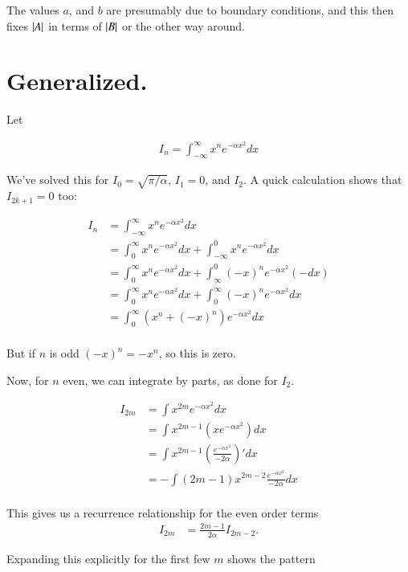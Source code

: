 The values $a$, and $b$ are presumably due to boundary conditions, and this then fixes $\left\lvert{A}\right\rvert$ in terms of $\left\lvert{B}\right\rvert$ or the other way around.

\section{Generalized. }

Let 

\begin{align}
I_n = \int_{-\infty}^\infty x^n e^{-\alpha x^2} dx
\end{align}

We've solved this for $I_0 = \sqrt{\pi/\alpha}$, $I_1 = 0$, and $I_2$.  A quick calculation shows that $I_{2k+1} = 0$ too:

\begin{align*}
I_n 
&= \int_{-\infty}^\infty x^n e^{-\alpha x^2} dx \\
&= \int_{0}^\infty x^n e^{-\alpha x^2} dx +\int_{-\infty}^0 x^n e^{-\alpha x^2} dx \\
&= \int_{0}^\infty x^n e^{-\alpha x^2} dx +\int_{\infty}^0 (-x)^n e^{-\alpha x^2} (-dx) \\
&= \int_{0}^\infty x^n e^{-\alpha x^2} dx +\int_0^{\infty} (-x)^n e^{-\alpha x^2} dx \\
&= \int_{0}^\infty (x^n + (-x)^n)e^{-\alpha x^2} dx \\
\end{align*}

But if $n$ is odd $(-x)^n = -x^n$, so this is zero.

Now, for $n$ even, we can integrate by parts, as done for $I_2$.

\begin{align*}
I_{2m}
&= \int x^{2m} e^{-\alpha x^2} dx \\
&= \int x^{2m-1} \left(x e^{-\alpha x^2}\right) dx \\
&= \int x^{2m-1} \left(\frac{e^{-\alpha x^2}}{-2\alpha}\right)' dx \\
&= -\int (2m-1) x^{2m-2} \frac{e^{-\alpha x^2}}{-2\alpha} dx \\
\end{align*}

This gives us a recurrence relationship for the even order terms
\begin{align}
I_{2m} &= \frac{2m-1}{2\alpha} I_{2m-2}.
\end{align}

Expanding this explicitly for the first few $m$ shows the pattern

